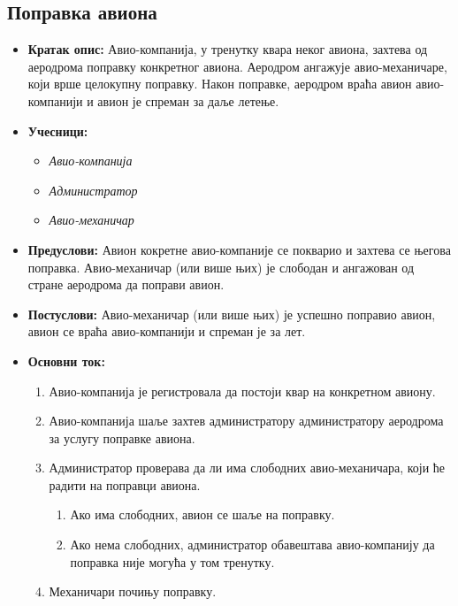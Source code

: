 \documentclass{article}
\begin{document}
\newpage
\subsection{Поправка авиона}

\begin{itemize}
    \item \textbf{Кратак опис:} Авио-компанија, у тренутку квара неког авиона, захтева од аеродрома поправку конкретног авиона. Аеродром ангажује авио-механичаре, који врше целокупну поправку. Након поправке, аеродром враћа авион авио-компанији и авион је спреман за даље летење.
    \item \textbf{Учесници:}
        \begin{itemize}
            \item \textit{Авио-компанија}
            \item \textit{Администратор}
            \item \textit{Авио-механичар}
        \end{itemize}
    \item \textbf{Предуслови:} Авион кокретне авио-компаније се покварио и захтева се његова поправка. Авио-механичар (или више њих) је слободан и ангажован од стране аеродрома да поправи авион.
    \item \textbf{Постуслови:} Авио-механичар (или више њих) је успешно поправио авион, авион се враћа авио-компанији и спреман је за лет.
    \item \textbf{Основни ток:}
        \begin{enumerate}
            \item Авио-компанија је регистровала да постоји квар на конкретном авиону.
            \item Авио-компанија шаље захтев администратору администратору аеродрома за услугу поправке авиона. %
            \item Администратор проверава да ли има слободних авио-механичара, који ће радити на поправци авиона.
                \begin{enumerate}
                    \item Ако има слободних, авион се шаље на поправку.
                    \item Ако нема слободних, администратор обавештава авио-компанију да поправка није могућа у том тренутку.
                \end{enumerate}
            \item Механичари почињу поправку.

\end{enumerate}
\end{itemize}
\end{document}
